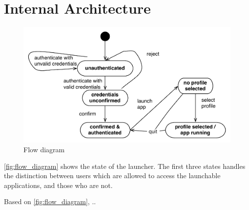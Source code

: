 \section{Internal Architecture}



\begin{figure}[h]
	\centering
	\includegraphics[width=1\textwidth]{gfx/flow-diagram2.pdf}
	\caption{Flow diagram}
	\label{fig:flow_diagram}
\end{figure}

\autoref{fig:flow_diagram} shows the state of the launcher. The first three states handles the distinction between users which are allowed to access the launchable applications, and those who are not. 

Based on \autoref{fig:flow_diagram}, ..